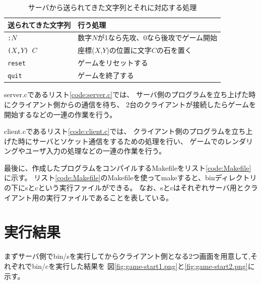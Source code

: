 \documentclass[a4j, titlepage, 10pt]{jsarticle}
\newcommand{\code}[1]{\texttt{#1}}
\begin{document}
\begin{table}[H]
  \centering
  \caption{サーバから送られてきた文字列とそれに対応する処理}
  \label{tab:mapping-received-str-and-corresponding-process}
  \begin{tabular}{ll} \toprule
    送られてきた文字列 & 行う処理 \\
    \midrule
    \code{:$N$} & 数字$N$が1なら先攻、0なら後攻でゲーム開始 \\
    \code{($X$,$Y$) $C$} & 座標($X$,$Y$)の位置に文字$C$の石を置く \\
    \code{reset} & ゲームをリセットする \\
    \code{quit} & ゲームを終了する \\
    \bottomrule
  \end{tabular}
\end{table}

server.cであるリスト\ref{code:server.c}では、
サーバ側のプログラムを立ち上げた時にクライアント側からの通信を待ち、
2台のクライアントが接続したらゲームを開始するなどの一連の作業を行う。

\lstset{ numbers = left }


client.cであるリスト\ref{code:client.c}では、
クライアント側のプログラムを立ち上げた時にサーバとソケット通信をするための処理を行い、
ゲームでのレンダリングやユーザ入力の処理などの一連の作業を行う。

\lstset{ numbers = left }


最後に、作成したプログラムをコンパイルするMakefileをリスト\ref{code:Makefile}に示す。
リスト\ref{code:Makefile}のMakefileを使ってmakeすると、binディレクトリの下にsとcという実行ファイルができる。
なお、sとcはそれぞれサーバ用とクライアント用の実行ファイルであることを表している。

\lstset{ numbers = left }



\section{実行結果}

まずサーバ側でbin/sを実行してからクライアント側となる2つ画面を用意して,それぞれでbin/cを実行した結果を
図\ref{fig:game-start1.png}と\ref{fig:game-start2.png}に示す。

\end{document}
